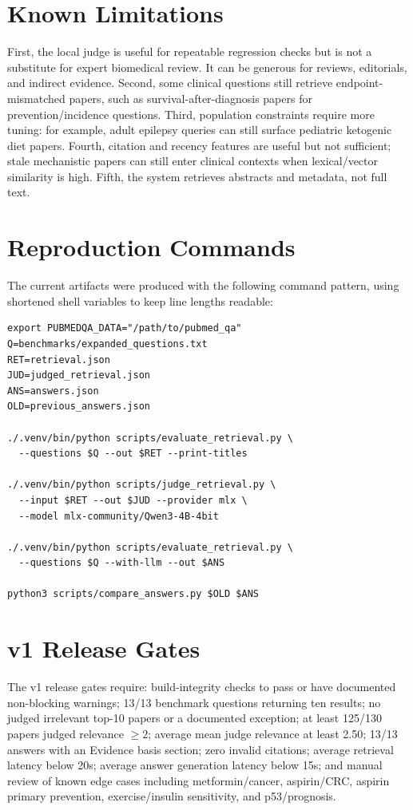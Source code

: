 \documentclass{article}
\begin{document}
\section{Known Limitations}

First, the local judge is useful for repeatable regression checks but is not a substitute for expert biomedical review. It can be generous for reviews, editorials, and indirect evidence. Second, some clinical questions still retrieve endpoint-mismatched papers, such as survival-after-diagnosis papers for prevention/incidence questions. Third, population constraints require more tuning: for example, adult epilepsy queries can still surface pediatric ketogenic diet papers. Fourth, citation and recency features are useful but not sufficient; stale mechanistic papers can still enter clinical contexts when lexical/vector similarity is high. Fifth, the system retrieves abstracts and metadata, not full text.

\section{Reproduction Commands}

The current artifacts were produced with the following command pattern, using shortened shell variables to keep line lengths readable:
\begin{scriptsize}
\begin{verbatim}
export PUBMEDQA_DATA="/path/to/pubmed_qa"
Q=benchmarks/expanded_questions.txt
RET=retrieval.json
JUD=judged_retrieval.json
ANS=answers.json
OLD=previous_answers.json

./.venv/bin/python scripts/evaluate_retrieval.py \
  --questions $Q --out $RET --print-titles

./.venv/bin/python scripts/judge_retrieval.py \
  --input $RET --out $JUD --provider mlx \
  --model mlx-community/Qwen3-4B-4bit

./.venv/bin/python scripts/evaluate_retrieval.py \
  --questions $Q --with-llm --out $ANS

python3 scripts/compare_answers.py $OLD $ANS
\end{verbatim}
\end{scriptsize}

\section{v1 Release Gates}

The v1 release gates require: build-integrity checks to pass or have documented non-blocking warnings; 13/13 benchmark questions returning ten results; no judged irrelevant top-10 papers or a documented exception; at least 125/130 papers judged relevance $\geq 2$; average mean judge relevance at least 2.50; 13/13 answers with an Evidence basis section; zero invalid citations; average retrieval latency below 20s; average answer generation latency below 15s; and manual review of known edge cases including metformin/cancer, aspirin/CRC, aspirin primary prevention, exercise/insulin sensitivity, and p53/prognosis.
\end{document}
